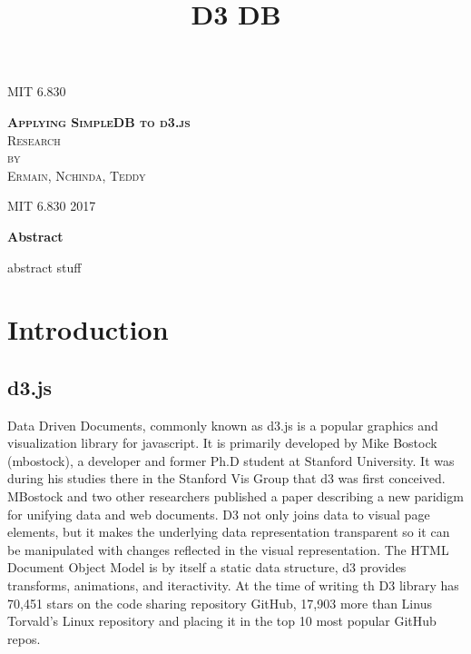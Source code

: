 \documentclass[a4paper]{article}
\begin{document}
\title{D3 DB}

\begin{titlepage}
\begin{center}

\textsc{\Large MIT 6.830}\\[4em]

\vspace{4em}

\textsc{\huge \textbf{Applying SimpleDB to d3.js}}\\[4em]

\textsc{\large Research}\\[1em]

\textsc{by}\\[1em]

\textsc{\Large Ermain, Nchinda, Teddy}\\[1em]

\end{center}

\vspace*{\fill}
\textsc{MIT 6.830\hspace*{\fill} 2017}

\end{titlepage}
\begin{center}
{\large\bf{Abstract\\}}
\end{center}
abstract stuff
\tableofcontents\label{c}
\newpage


\section{Introduction} \label{overview}%
\subsection{d3.js}
Data Driven Documents, commonly known as d3.js is a popular graphics and visualization library for javascript. It is primarily developed by Mike Bostock (mbostock), a developer and former Ph.D student at Stanford University. It was during his studies there in the Stanford Vis Group that d3 was first conceived. MBostock and two other researchers published a paper describing a new paridigm for unifying data and web documents. D3 not only joins data to visual page elements, but it makes the underlying data representation transparent so it can be manipulated with changes reflected in the visual representation. The HTML Document Object Model is by itself a static data structure, d3 provides transforms, animations, and iteractivity. At the time of writing th D3 library has 70,451 stars on the code sharing repository GitHub, 17,903 more than Linus Torvald's Linux repository and placing it in the top 10 most popular GitHub repos.
	
\end{document}

